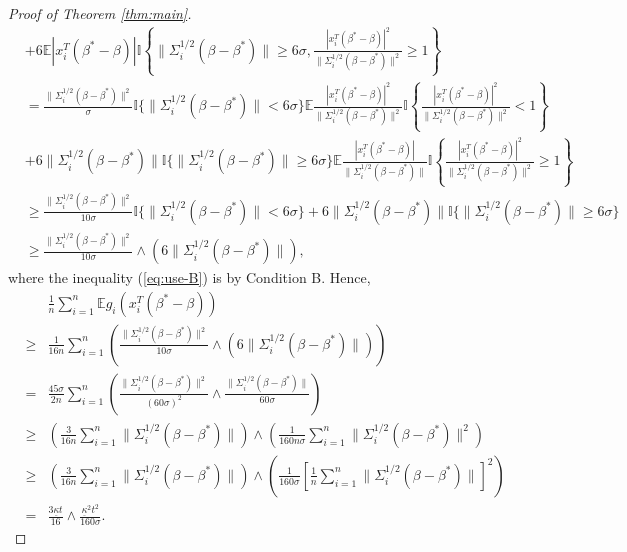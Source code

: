 \begin{proof}[Proof of Theorem \ref{thm:main}]
\begin{align}
\nonumber & + 6\mathbb{E}|x_i^T(\beta^*-\beta)|\mathbb{I}\left\{\|\Sigma_i^{1/2}(\beta-\beta^*)\|\geq 6\sigma, \frac{|x_i^T(\beta^*-\beta)|^2}{\|\Sigma_i^{1/2}(\beta-\beta^*)\|^2}\geq 1\right\}  \\
\nonumber &= \frac{\|\Sigma_i^{1/2}(\beta-\beta^*)\|^2}{\sigma}\mathbb{I}\{\|\Sigma_i^{1/2}(\beta-\beta^*)\|< 6\sigma\}\mathbb{E}\frac{|x_i^T(\beta^*-\beta)|^2}{\|\Sigma_i^{1/2}(\beta-\beta^*)\|^2}\mathbb{I}\left\{\frac{|x_i^T(\beta^*-\beta)|^2}{\|\Sigma_i^{1/2}(\beta-\beta^*)\|^2}< 1\right\} \\
\nonumber & + 6\|\Sigma_i^{1/2}(\beta-\beta^*)\|\mathbb{I}\{\|\Sigma_i^{1/2}(\beta-\beta^*)\|\geq 6\sigma\}\mathbb{E}\frac{|x_i^T(\beta^*-\beta)|}{\|\Sigma_i^{1/2}(\beta-\beta^*)\|}\mathbb{I}\left\{\frac{|x_i^T(\beta^*-\beta)|^2}{\|\Sigma_i^{1/2}(\beta-\beta^*)\|^2}\geq 1\right\} \\
\label{eq:use-B} &\geq \frac{\|\Sigma_i^{1/2}(\beta-\beta^*)\|^2}{10\sigma}\mathbb{I}\{\|\Sigma_i^{1/2}(\beta-\beta^*)\|< 6\sigma\} + 6\|\Sigma_i^{1/2}(\beta-\beta^*)\|\mathbb{I}\{\|\Sigma_i^{1/2}(\beta-\beta^*)\|\geq 6\sigma\} \\
\nonumber &\geq \frac{\|\Sigma_i^{1/2}(\beta-\beta^*)\|^2}{10\sigma}\wedge\left(6\|\Sigma_i^{1/2}(\beta-\beta^*)\|\right),
\end{align}
where the inequality (\ref{eq:use-B}) is by Condition B.
Hence,
\begin{eqnarray}
\nonumber && \frac{1}{n}\sum_{i=1}^n\mathbb{E}g_i(x_i^T(\beta^*-\beta)) \\
\nonumber &\geq& \frac{1}{16n}\sum_{i=1}^n\left(\frac{\|\Sigma_i^{1/2}(\beta-\beta^*)\|^2}{10\sigma}\wedge\left(6\|\Sigma_i^{1/2}(\beta-\beta^*)\|\right)\right) \\
\nonumber &=&  \frac{45\sigma}{2n}\sum_{i=1}^n\left(\frac{\|\Sigma_i^{1/2}(\beta-\beta^*)\|^2}{(60\sigma)^2}\wedge \frac{\|\Sigma_i^{1/2}(\beta-\beta^*)\|}{60\sigma}\right) \\
\label{eq:use-wang} &\geq& \left(\frac{3}{16n}\sum_{i=1}^n\|\Sigma_i^{1/2}(\beta-\beta^*)\|\right) \wedge \left(\frac{1}{160n\sigma}\sum_{i=1}^n\|\Sigma_i^{1/2}(\beta-\beta^*)\|^2\right) \\
\nonumber &\geq& \left(\frac{3}{16n}\sum_{i=1}^n\|\Sigma_i^{1/2}(\beta-\beta^*)\|\right)\wedge \left(\frac{1}{160\sigma}\left[\frac{1}{n}\sum_{i=1}^n\|\Sigma_i^{1/2}(\beta-\beta^*)\|\right]^2\right) \\
\nonumber &=& \frac{3\underline{\kappa}t}{16}\wedge\frac{\underline{\kappa}^2t^2}{160\sigma}.
\end{eqnarray}

\end{proof}
